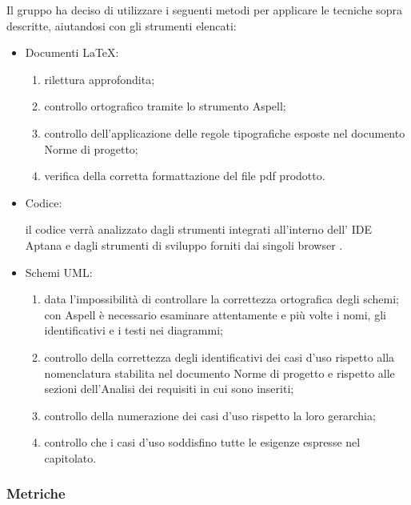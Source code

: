 Il gruppo ha deciso di utilizzare i seguenti metodi per applicare le tecniche sopra
descritte, aiutandosi con gli strumenti elencati:
\begin{itemize}
\item Documenti \LaTeX:
\begin{enumerate}
\item rilettura approfondita;
\item controllo ortografico tramite lo strumento Aspell;
\item controllo dell'applicazione delle regole tipografiche esposte nel documento Norme di progetto;
\item verifica della corretta formattazione del file pdf prodotto.
\end{enumerate}

\item Codice:
 
il codice verrà analizzato dagli strumenti integrati all'interno dell' IDE Aptana e dagli strumenti di sviluppo forniti dai singoli browser .

\item Schemi UML:
\begin{enumerate}


\item data l'impossibilità di controllare la correttezza ortografica degli schemi;
con Aspell è necessario esaminare attentamente e più   volte i nomi, gli identificativi e i testi nei diagrammi;
\item controllo della correttezza degli identificativi dei casi d'uso rispetto alla nomenclatura stabilita nel documento Norme di progetto e rispetto alle sezioni dell'Analisi dei requisiti in cui sono inseriti;
\item controllo della numerazione dei casi d'uso rispetto la loro gerarchia;
\item controllo che i casi d'uso soddisfino tutte le esigenze espresse nel capitolato.
\end{enumerate}
\end{itemize}
\subsubsection{Metriche}

